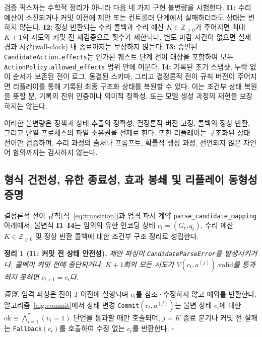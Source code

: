 \documentclass[journal]{IEEEtran}
\begin{document}
검증 픽스처는 수학적 정리가 아니라 다음 네 가지 구현 불변량을 시험한다. \textbf{I1:} 수리 예산이 소진되거나 커밋 이전에 제안 또는 컨트롤러 단계에서 실패하더라도 상태는 변하지 않는다. \textbf{I2:} 정상 반환되는 수리 콜백과 수리 예산 $K\in\mathbb{Z}_{\geq 0}$가 주어지면 최대 $K+1$회 시도와 커밋 전 재검증으로 횟수가 제한되나, 별도 마감 시간이 없으면 실제 경과 시간(wall-clock) 내 종료까지는 보장하지 않는다. \textbf{I3:} 승인된 \texttt{CandidateAction.effects}는 인가된 퀘스트 단계 전이 대상을 포함하여 모두 \texttt{ActionPolicy.allowed\_effects} 범위 안에 머문다. \textbf{I4:} 기록된 초기 스냅샷, 누락 없이 순서가 보존된 전이 로그, 동결된 스키마, 그리고 결정론적 전이 규칙 버전이 주어지면 리플레이를 통해 기록된 최종 구조화 상태를 복원할 수 있다. 이는 조건부 상태 복원을 뜻할 뿐, 기록의 진위 인증이나 의미적 정확성, 또는 모델 생성 과정의 재현을 보장하지는 않는다.

이러한 불변량은 정책과 상태 추출의 정확성, 결정론적 버전 고정, 콜백의 정상 반환, 그리고 단일 프로세스의 파일 소유권을 전제로 한다. 또한 리플레이는 구조화된 상태 전이만 검증하며, 수리 과정의 출처나 프롬프트, 확률적 생성 과정, 선언되지 않은 자연어 함의까지는 검사하지 않는다.

\subsection{형식 건전성, 유한 종료성, 효과 봉쇄 및 리플레이 동형성 증명}\label{sec:formal-proofs}
결정론적 전이 규칙(식~\ref{eq:transition})과 엄격 파서 계약 \texttt{parse\_\allowbreak candidate\_\allowbreak mapping} 아래에서, 불변식 \textbf{I1--I4}는 임의의 유한 인코딩 상태 $c_t=(G_t,q_t)$, 수리 예산 $K\in\mathbb{Z}_{\geq 0}$ 및 정상 반환 콜백에 대한 조건부 구조 정리로 성립한다.

\noindent\textbf{정리 1 (I1: 커밋 전 상태 안전성).} \emph{제안 파싱이 \texttt{CandidateParseError}를 발생시키거나, 콜백이 커밋 전에 중단되거나, $K{+}1$회의 모든 시도가 $V(c_t,a^{(j)}).\mathrm{valid}$를 통과하지 못하면 $c_{t+1}=c_t$다.}
\par\noindent\textit{증명.} 엄격 파싱은 전이 $T$ 이전에 실행되며 $c_t$를 참조·수정하지 않고 예외를 반환한다. 알고리즘~\ref{alg:commit}에서 상태 변경 \texttt{Commit}$(c_t,a^{(j)})$는 불변 상태 $c_t$에 대한 $\mathrm{ok}\equiv\bigwedge_{i=1}^{7}(v_i=1)$ 단언을 통과할 때만 호출되며, $j=K$ 종료 분기나 커밋 전 실패는 \texttt{Fallback}$(c_t)$를 호출하여 수정 없는 $c_t$를 반환한다. \hfill$\square$
\end{document}
